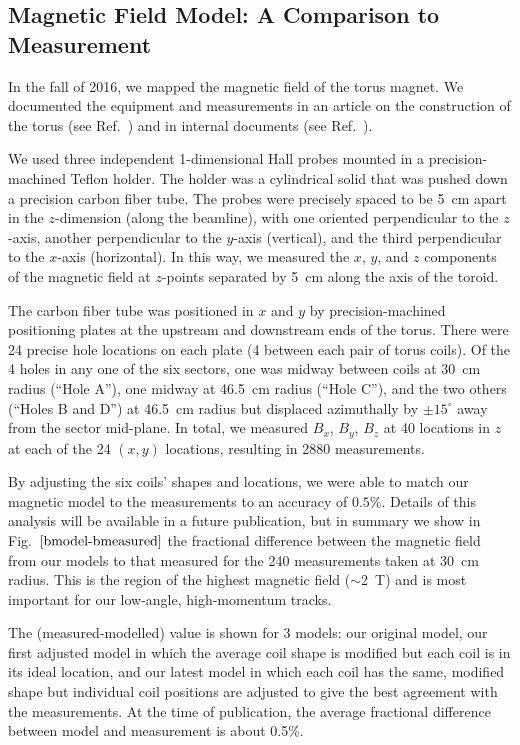 \subsection{Magnetic Field Model: A Comparison to Measurement}

In the fall of 2016, we mapped the magnetic field of the torus magnet.
We documented the equipment and measurements in an article on the
construction of the torus (see Ref.~\cite{torus-ieee}) and in internal
documents (see Ref.~\cite{magmapping}).

We used three independent 1-dimensional Hall probes mounted in a precision-machined
Teflon holder.  The holder was a cylindrical solid that was pushed down a precision
carbon fiber tube.  The probes were precisely spaced to be 5~cm apart in the $z$-dimension
(along the beamline), with one oriented perpendicular to the $z$-axis, another perpendicular to
the $y$-axis (vertical), and the third perpendicular to the $x$-axis (horizontal).  In this way, we
measured the $x$, $y$, and $z$ components of the magnetic field at $z$-points separated by 5~cm
along the axis of the toroid.

The carbon fiber tube was positioned in $x$ and $y$ by precision-machined positioning plates at the
upstream and downstream ends of the torus.  There were 24 precise hole locations on each
plate (4 between each pair of torus coils).  Of the 4 holes in any one of the six sectors,
one  was midway between coils at 30~cm radius (``Hole A''), one midway at 46.5~cm radius (``Hole C''), and the two others (``Holes B and D'')
at 46.5~cm radius but displaced azimuthally by $\pm15^\circ$ away from the sector mid-plane.  
In total, we measured $B_x$, $B_y$, $B_z$ at 40 locations in $z$ at each of the 24 $(x,y)$ locations,
resulting in 2880 measurements.

By adjusting the six coils' shapes and locations, we were able to match our
magnetic model to the measurements to an accuracy of $0.5\%$.  Details of this
analysis will be available in a future publication, but in summary we
show in Fig.~$\ref{bmodel-bmeasured}$ the fractional difference between
the magnetic field from our models to that measured for the 240 measurements
taken at 30~cm radius.  This is the region of the highest magnetic field ($\sim$2~T)
and is most important for our low-angle, high-momentum tracks.

The (measured-modelled) value is shown for 3 models: our original
model, our first adjusted model in which the average coil shape is modified but each
coil is in its ideal location, and
our latest model in which each coil has the same, modified shape but individual coil positions are
adjusted to give the best agreement with the measurements. 
At the time of publication, the average fractional difference between model and measurement is about 0.5\%.


